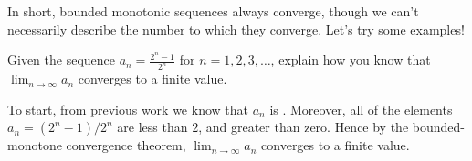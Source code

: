 \documentclass{ximera}
\begin{document}

In short, bounded monotonic sequences always converge, though we can't
necessarily describe the number to which they converge.  Let's try
some examples!

\begin{example}
  Given the sequence $a_n=\frac{2^n-1}{2^n}$ for $n=1,2,3,\dots$,
  explain how you know that $\lim_{n\to\infty} a_n$ converges to a
  finite value.
  \begin{explanation}
    To start, from previous work we know that $a_n$ is
    .
    Moreover, all of the elements $a_n = (2^n-1)/2^n$ are less than
    $2$, and greater than zero. Hence by the bounded-monotone
    convergence theorem, $\lim_{n\to\infty} a_n$ converges to a finite
    value.
  \end{explanation}
\end{example}
\end{document}
